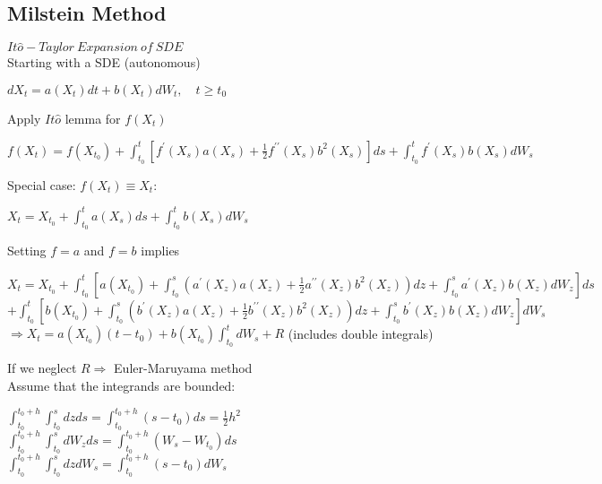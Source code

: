\documentclass{article}
\begin{document}
\subsection{Milstein Method}
$It\hat{o} -Taylor\  Expansion\  of\  SDE$\\
Starting with a SDE (autonomous)
\begin{center}
	$d X_{t}=a\left(X_{t}\right) d t+b\left(X_{t}\right) d W_{t}, \quad t \geq t_{0}$
\end{center}
Apply $It\hat{o}$ lemma for $f(X_t)$
\begin{center}
	$f\left(X_{t}\right)=f\left(X_{t_{0}}\right)+\int_{t_{0}}^{t}\left[f^{\prime}\left(X_{s}\right) a\left(X_{s}\right)+\frac{1}{2} f^{\prime \prime}\left(X_{s}\right) b^{2}\left(X_{s}\right)\right] d s+\int_{t_{0}}^{t} f^{\prime}\left(X_{s}\right) b\left(X_{s}\right) d W_{s}$
\end{center}
Special case: $f\left( X_{t}\right)  \equiv X_{t}$:
\begin{center}
	$X_{t}=X_{t_{0}}+\int_{t_{0}}^{t} a\left(X_{s}\right) d s+\int_{t_{0}}^{t} b\left(X_{s}\right) d W_{s}$
\end{center}
Setting $f=a$ and $f=b$ implies
\begin{center}
	$X_{t}=X_{t_{0}}+\int_{t_{0}}^{t}\left[a\left(X_{t_{0}}\right)+\int_{t_{0}}^{s}\left(a^{\prime}\left(X_{z}\right) a\left(X_{z}\right)+\frac{1}{2} a^{\prime \prime}\left(X_{z}\right) b^{2}\left(X_{z}\right)\right) d z+\int_{t_{0}}^{s} a^{\prime}\left(X_{z}\right) b\left(X_{z}\right) d W_{z}\right] d s$
$+\int_{t_{0}}^{t}\left[b\left(X_{t_{0}}\right)+\int_{t_{0}}^{s}\left(b^{\prime}\left(X_{z}\right) a\left(X_{z}\right)+\frac{1}{2} b^{\prime \prime}\left(X_{z}\right) b^{2}\left(X_{z}\right)\right) d z+\int_{t_{0}}^{s} b^{\prime}\left(X_{z}\right) b\left(X_{z}\right) d W_{z}\right] d W_{s}$
$\Rightarrow X_{t}=a\left(X_{t_{0}}\right)\left(t-t_{0}\right)+b\left(X_{t_{0}}\right) \int_{t_{0}}^{t} d W_{s}+R$ (includes double integrals)
\end{center}
If we neglect $R\Rightarrow $ Euler-Maruyama method
\\Assume that the integrands are bounded:
\begin{center}
	$\int_{t_{0}}^{t_{0}+h} \int_{t_{0}}^{s} d z d s=\int_{t_{0}}^{t_{0}+h}\left(s-t_{0}\right) d s=\frac{1}{2} h^{2}$\\
$\int_{t_{0}}^{t_{0}+h} \int_{t_{0}}^{s} d W_{z} d s=\int_{t_{0}}^{t_{0}+h}\left(W_{s}-W_{t_{0}}\right) d s$\\
$\int_{t_{0}}^{t_{0}+h} \int_{t_{0}}^{s} d z d W_{s}=\int_{t_{0}}^{t_{0}+h}\left(s-t_{0}\right) d W_{s}$
\end{center}
\end{document}
